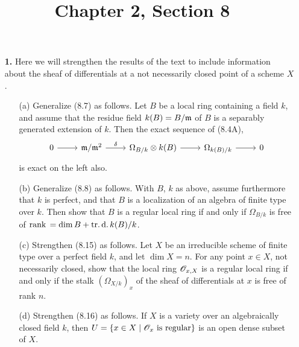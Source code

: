 \documentclass{article}
\title{Chapter 2, Section 8}
\begin{document}
\maketitle
\begin{enumerate} [label=\textbf{\arabic*.}, leftmargin=0em]

\item[\textbf{1.}] Here we will strengthen the results of the text to include information about the sheaf of differentials at a not necessarily closed point of a scheme $X$.
\begin{itemize}
    \item[(a)] Generalize (8.7) as follows.
    Let $B$ be a local ring containing a field $k$, and assume that the residue field $k(B) = B / \mathfrak{m}$ of $B$ is a separably generated extension of $k$. 
    Then the exact sequence of (8.4A),
    \[ \begin{tikzcd}
        0 \arrow[r] & \goth{m}/\goth{m}^2 \arrow[r, "\delta"] & \Omega_{B/k} \otimes k(B) \arrow[r] & \Omega_{k(B)/k} \arrow[r] & 0
        \end{tikzcd} \]
    is exact on the left also.

    \item[(b)] Generalize (8.8) as follows. With $B$, $k$ as above, assume furthermore that $k$ is perfect, and that $B$ is a localization of an algebra of finite type over $k$. Then show that $B$ is a regular local ring if and only if $\Omega_{B/k}$ is free of $\operatorname{rank}{} = \dim{B} + \operatorname{tr.d.} k(B) / k$.

    \item[(c)] Strengthen (8.15) as follows.
    Let $X$ be an irreducible scheme of finite type over a perfect field $k$, and let $\dim{X} = n$.
    For any point $x \in X$, not necessarily closed, show that the local ring $\mathscr{O}_{x, X}$ is a regular local ring if and only if the stalk $(\Omega_{X/k})_x$ of the sheaf of differentials at $x$ is free of rank $n$.

    \item[(d)] Strengthen (8.16) as follows. If $X$ is a variety over an algebraically closed field $k$, then $U = \{x \in X \mid \mathscr{O}_x \text{ is regular} \}$ is an open dense subset of $X$.
\end{itemize}


\end{enumerate}
\end{document}
